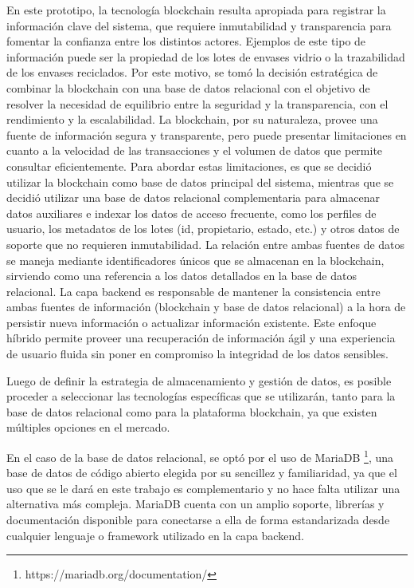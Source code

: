 En este prototipo, la tecnología blockchain resulta apropiada para registrar la información clave del sistema, que requiere inmutabilidad y transparencia para fomentar la confianza entre los distintos actores. Ejemplos de este tipo de información puede ser la propiedad de los lotes de envases vidrio o la trazabilidad de los envases reciclados. Por este motivo, se tomó la decisión estratégica de combinar la blockchain con una base de datos relacional con el objetivo de resolver la necesidad de equilibrio entre la seguridad y la transparencia, con el rendimiento y la escalabilidad. La blockchain, por su naturaleza, provee una fuente de información segura y transparente, pero puede presentar limitaciones en cuanto a la velocidad de las transacciones y el volumen de datos que permite consultar eficientemente. Para abordar estas limitaciones, es que se decidió utilizar la blockchain como base de datos principal del sistema, mientras que se decidió utilizar una base de datos relacional complementaria para almacenar datos auxiliares e indexar los datos de acceso frecuente, como los perfiles de usuario, los metadatos de los lotes (id, propietario, estado, etc.) y otros datos de soporte que no requieren inmutabilidad. La relación entre ambas fuentes de datos se maneja mediante identificadores únicos que se almacenan en la blockchain, sirviendo como una referencia a los datos detallados en la base de datos relacional. La capa backend es responsable de mantener la consistencia entre ambas fuentes de información (blockchain y base de datos relacional) a la hora de persistir nueva información o actualizar información existente. Este enfoque híbrido permite proveer una recuperación de información ágil y una experiencia de usuario fluida sin poner en compromiso la integridad de los datos sensibles.

Luego de definir la estrategia de almacenamiento y gestión de datos, es posible proceder a seleccionar las tecnologías específicas que se utilizarán, tanto para la base de datos relacional como para la plataforma blockchain, ya que existen múltiples opciones en el mercado.

En el caso de la base de datos relacional, se optó por el uso de MariaDB \footnote{https://mariadb.org/documentation/}, una base de datos de código abierto elegida por su sencillez y familiaridad, ya que el uso que se le dará en este trabajo es complementario y no hace falta utilizar una alternativa más compleja. MariaDB cuenta con un amplio soporte, librerías y documentación disponible para conectarse a ella de forma estandarizada desde cualquier lenguaje o framework utilizado en la capa backend.

